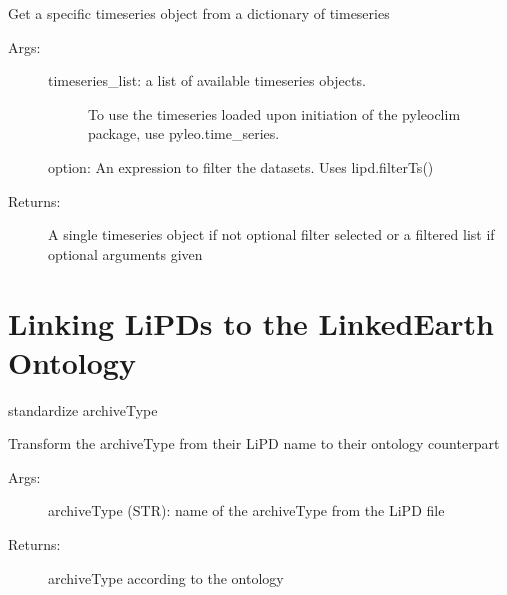 \documentclass[letterpaper,10pt,english]{sphinxmanual}
\begin{document}

\begin{fulllineitems}
\label{\detokenize{LIPDutils:pyleoclim.LipdUtils.getTs}}
Get a specific timeseries object from a dictionary of timeseries
\begin{description}
\item[{Args:}] \leavevmode\begin{description}
\item[{timeseries\_list: a  list of available timeseries objects. }] \leavevmode
To use the timeseries loaded upon initiation of the 
pyleoclim package, use pyleo.time\_series.

\end{description}

option: An expression to filter the datasets. Uses lipd.filterTs()

\item[{Returns:}] \leavevmode
A single timeseries object if not optional filter selected or a filtered
list if optional arguments given

\end{description}

\end{fulllineitems}



\section{Linking LiPDs to the LinkedEarth Ontology}
\label{\detokenize{LIPDutils:linking-lipds-to-the-linkedearth-ontology}}

\begin{fulllineitems}
\label{\detokenize{LIPDutils:pyleoclim.LipdUtils.LipdToOntology}}
standardize archiveType

Transform the archiveType from their LiPD name to their ontology counterpart
\begin{description}
\item[{Args:}] \leavevmode
archiveType (STR): name of the archiveType from the LiPD file

\item[{Returns:}] \leavevmode
archiveType according to the ontology

\end{description}

\end{fulllineitems}
\end{document}
